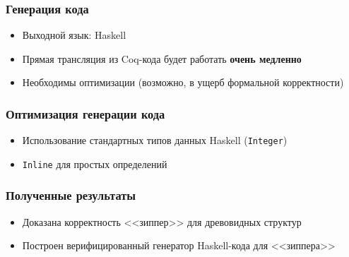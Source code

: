 \documentclass{beamer}
\begin{document}
\begin{frame}
\frametitle{Генерация кода}
\begin{itemize}
\item Выходной язык: Haskell
\item Прямая трансляция из Coq-кода будет работать \textbf{очень медленно}
\item Необходимы оптимизации (возможно, в ущерб формальной корректности)
\end{itemize}
\end{frame}

\begin{frame}[fragile]
\frametitle{Оптимизация генерации кода}
\begin{itemize}
\item Использование стандартных типов данных Haskell (\texttt{Integer})
\item \texttt{Inline} для простых определений
\end{itemize}
\end{frame}

\begin{frame}
\frametitle{Полученные результаты}
\begin{itemize}
\item Доказана корректность <<зиппер>> для древовидных структур
\item Построен верифицированный генератор Haskell-кода для <<зиппера>>
\end{itemize}
\end{frame}
\end{document}

